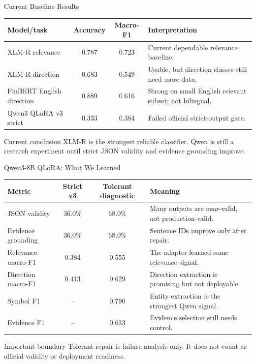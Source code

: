 \documentclass[aspectratio=169,11pt,hyperref={bookmarks=false}]{beamer}
\newcommand{\smallsep}{\vspace{0.35em}}
\begin{document}
\begin{frame}{Current Baseline Results}
  \small
  \begin{tabularx}{\textwidth}{@{}lccX@{}}
    \toprule
    Model/task & Accuracy & Macro-F1 & Interpretation \\
    \midrule
    XLM-R relevance & 0.787 & 0.723 & Current dependable relevance baseline. \\
    XLM-R direction & 0.683 & 0.549 & Usable, but direction classes still need more data. \\
    FinBERT English direction & 0.889 & 0.616 & Strong on small English relevant subset; not bilingual. \\
    Qwen3 QLoRA v3 strict & 0.333 & 0.384 & Failed official strict-output gate. \\
    \bottomrule
  \end{tabularx}
  \smallsep
  \begin{block}{Current conclusion}
    XLM-R is the strongest reliable classifier. Qwen is still a research experiment until strict JSON validity and evidence grounding improve.
  \end{block}
\end{frame}

\begin{frame}{Qwen3-8B QLoRA: What We Learned}
  \small
  \begin{tabularx}{\textwidth}{@{}lccX@{}}
    \toprule
    Metric & Strict v3 & Tolerant diagnostic & Meaning \\
    \midrule
    JSON validity & 36.0\% & 68.0\% & Many outputs are near-valid, not production-valid. \\
    Evidence grounding & 36.0\% & 68.0\% & Sentence IDs improve only after repair. \\
    Relevance macro-F1 & 0.384 & 0.555 & The adapter learned some relevance signal. \\
    Direction macro-F1 & 0.413 & 0.629 & Direction extraction is promising but not deployable. \\
    Symbol F1 & -- & 0.790 & Entity extraction is the strongest Qwen signal. \\
    Evidence F1 & -- & 0.633 & Evidence selection still needs control. \\
    \bottomrule
  \end{tabularx}
  \smallsep
  \begin{block}{Important boundary}
    Tolerant repair is failure analysis only. It does not count as official validity or deployment readiness.
  \end{block}
\end{frame}
\end{document}
